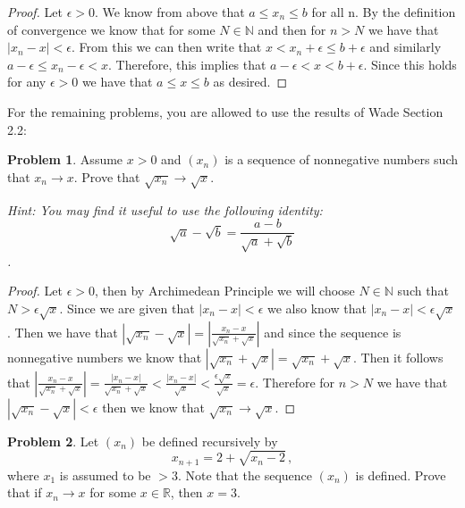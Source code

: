 \documentclass[11pt]{article}
\theoremstyle{definition}
\newtheorem{problem}{Problem}
\newcommand{\N}{\mathbb{N}}
\newcommand{\R}{\mathbb{R}}
\begin{document}
\begin{proof}
Let $\epsilon > 0$. We know from above that $a\leq x_n \leq b$ for all n. By the definition of convergence we know that for some $N\in \N$ and then for $n> N$ we have that $|x_n-x|<\epsilon.$ From this we can then write that $x<x_n+\epsilon \leq b+\epsilon$ and similarly $a-\epsilon \leq x_n-\epsilon < x$. Therefore, this implies that $a-\epsilon < x < b+\epsilon$. Since this holds for any $\epsilon >0$ we have that $a\leq x \leq b$ as desired.
\end{proof}

\newpage

For the remaining problems, you are allowed to use the results of Wade Section 2.2: 

\begin{problem}
Assume $x > 0$ and $(x_n)$ is a sequence of nonnegative numbers such that $x_n \to x$. Prove that $\sqrt{x_n} \to \sqrt{x}$. 

\emph{Hint: You may find it useful to use the following identity: 
\[
\sqrt a - \sqrt b = \frac{a - b}{\sqrt a + \sqrt b}
\].}
\end{problem}

\begin{proof}
Let $\epsilon > 0$, then by Archimedean Principle we will choose $N\in \N$ such that $N > \epsilon\sqrt{x}$. Since we are given that $|x_n-x|<\epsilon$ we also know that $|x_n-x|<\epsilon\sqrt{x}$. Then we have that $|\sqrt{x_n}-\sqrt{x}| = |\frac{x_n-x}{\sqrt{x_n}+\sqrt{x}}|$ and since the sequence is nonnegative numbers we know that $|\sqrt{x_n} + \sqrt{x}| = \sqrt{x_n} + \sqrt{x}$. Then it follows that $|\frac{x_n-x}{\sqrt{x_n} + \sqrt{x}}| = \frac{|x_n-x|}{\sqrt{x_n} + \sqrt{x}} < \frac{|x_n-x|}{\sqrt{x}} < \frac{\epsilon\sqrt{x}}{\sqrt{x}}=\epsilon$. Therefore for $n > N$ we have that $|\sqrt{x_n}-\sqrt{x}| < \epsilon$ then we know that $\sqrt{x_n}\rightarrow \sqrt{x}.$
\end{proof}

\newpage

\begin{problem}
Let $(x_n)$ be defined recursively by 
\[
x_{n + 1} = 2 + \sqrt{x_n -2} \,,
\]
where $x_1$ is assumed to be $> 3$. Note that the sequence $(x_n)$ is defined. 
Prove that if $x_n \to x$ for some $x \in \R$, then $x = 3$. 
\end{problem}
\end{document}
